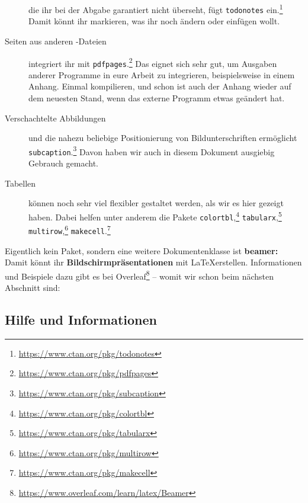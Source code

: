 \begin{description}
		die ihr bei der Abgabe garantiert nicht überseht, fügt \texttt{todonotes} ein.\footnote{\url{https://www.ctan.org/pkg/todonotes}}
		Damit könnt ihr markieren, was ihr noch ändern oder einfügen wollt.
	\item[Seiten aus anderen \acro{PDF}-Dateien]
		integriert ihr mit \texttt{pdfpages}.\footnote{\url{https://www.ctan.org/pkg/pdfpages}}
		Das eignet sich sehr gut, um Ausgaben anderer Programme in eure Arbeit zu integrieren, beispielsweise in einem Anhang. 
		Einmal kompilieren, und schon ist auch der Anhang wieder auf dem neuesten Stand, wenn das externe Programm etwas geändert hat.
	\item[Verschachtelte Abbildungen]
		und die nahezu beliebige Positionierung von Bildunterschriften ermöglicht \texttt{subcaption}.\footnote{\url{https://www.ctan.org/pkg/subcaption}}
		Davon haben wir auch in diesem Dokument ausgiebig Gebrauch gemacht.
	\item[Tabellen]
		können noch sehr viel flexibler gestaltet werden, als wir es hier gezeigt haben.
		Dabei helfen unter anderem die Pakete 
		\texttt{colortbl},\footnote{\url{https://www.ctan.org/pkg/colortbl}}
		\texttt{tabularx},\footnote{\url{https://www.ctan.org/pkg/tabularx}}
		\texttt{multirow},\footnote{\url{https://www.ctan.org/pkg/multirow}}
		\texttt{makecell}.\footnote{\url{https://www.ctan.org/pkg/makecell}}
\end{description}

\noindent Eigentlich kein Paket, sondern eine weitere Dokumentenklasse ist \textbf{beamer:} Damit könnt ihr \textbf{Bildschirmpräsentationen} mit \LaTeX erstellen.
Informationen und Beispiele dazu gibt es bei Overleaf\footnote{\url{https://www.overleaf.com/learn/latex/Beamer}} –
womit wir schon beim nächsten Abschnitt sind:

\subsection{Hilfe und Informationen}
